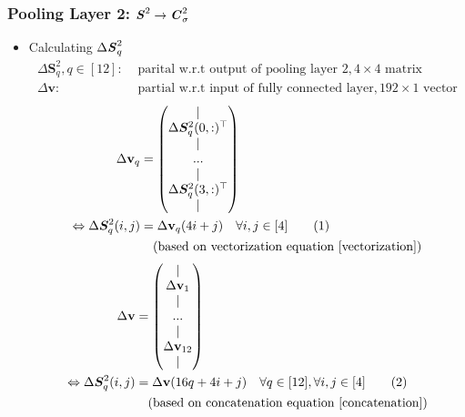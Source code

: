 \documentclass[12pt]{article}
\renewcommand{\vec}[1]{\mathbf{#1}}
\newcommand\numberthis{\stepcounter{equation}\tag{\theequation}}
\begin{document}
\subsubsection{Pooling Layer 2: $ \textbf{\textit{S}}^2 \rightarrow \textbf{\textit{C}}^2_\sigma$}
\begin{itemize}
\item Calculating $\Delta \textbf{\textit{S}}_q^2$
\begin{align*}
    \Delta \bm{S}^2_q, q \in [12]:& \text{ parital w.r.t output of pooling layer 2}, 4 \times 4 \text{ matrix}\\
    \Delta\vec{v}:& \text{ partial w.r.t input of fully connected layer}, 192 \times 1 \text{ vector}
\end{align*}
\begin{align*}
    \Delta \vec{v}_q &= \begin{pmatrix} | \\ \Delta \bm{S}^2_q(0, :)^\top \\ | \\ ... \\ | \\ \Delta \bm{S}^2_q(3, :)^\top \\ | \end{pmatrix}
    \\
    \Leftrightarrow \Delta \bm{S}^2_q(i, j) &= \Delta \vec{v}_q(4i + j) \quad \forall i, j \in [4]
    \numberthis \label{delta_vectorization}
    \\
    &\quad (\text{based on vectorization equation } \eqref{vectorization})
\end{align*}
\begin{align*}
    \Delta \vec{v} &= \begin{pmatrix} | \\ \Delta \vec{v}_1 \\ | \\ ... \\ | \\ \Delta \vec{v}_{12} \\ | \end{pmatrix}\\
    \Leftrightarrow \Delta \bm{S}^2_q(i, j) &= \Delta \vec{v}(16q + 4i + j) \quad \forall q \in [12], \forall i, j \in [4]
    \numberthis \label{delta_concatenation}
    \\
    &\quad (\text{based on concatenation equation } \eqref{concatenation})
\end{align*}
\end{itemize}
\end{document}
